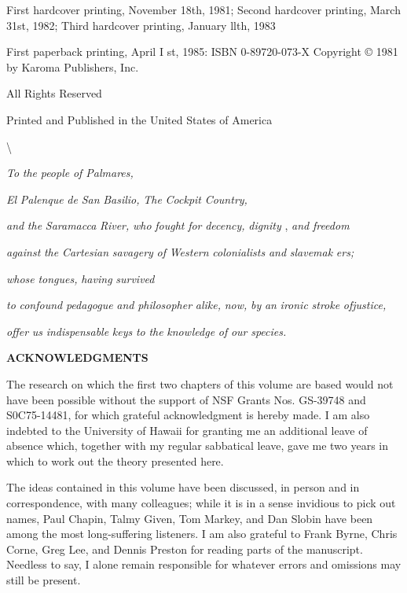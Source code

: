

First hardcover printing, November 18th, 1981; Second hardcover printing, March 31st, 1982; Third hardcover printing, January llth, 1983

First paperback printing, April I st, 1985: ISBN 0-89720-073-X Copyright © 1981 by Karoma Publishers, Inc.

All Rights Reserved

Printed and Published in the United States of America

{\textbackslash}

\textit{To} \textit{the} \textit{people} \textit{of Palmares,}

\textit{El} \textit{Palenque} \textit{d}\textit{e} \textit{San} \textit{Basilio,} \textit{The} \textit{Cockpit} \textit{Country,}

\textit{and} \textit{the} \textit{Saramacca} \textit{River,} \textit{who} \textit{fought} \textit{for} \textit{decency,} \textit{dignity} , \textit{and} \textit{freedom}

\textit{against} \textit{the} \textit{Cartesian} \textit{savagery} \textit{of} \textit{Western} \textit{colonialists} \textit{and} \textit{slavemak} \textit{ers;}

\textit{whose} \textit{tongues,} \textit{having} \textit{survived}

\textit{to} \textit{confound} \textit{pedagogue} \textit{and} \textit{philosopher} \textit{alike,} \textit{now,} \textit{by} \textit{an} \textit{ironic} \textit{stroke} \textit{ofjustice,}

\textit{offer} \textit{us} \textit{indispensable} \textit{keys} \textit{to} \textit{the} \textit{knowledge} \textit{of} \textit{our} \textit{species.}

\bfseries
\hypertarget{TOC250001}{}ACKNOWLEDGMENTS

The research on which the first two chapters of this volume are based would not have been possible without the support of NSF Grants Nos. GS-39748 and S0C75-14481, for which grateful acknowledgment is hereby made. I am also indebted to the University of Hawaii for granting me an additional leave of absence which, together with my regular sabbatical leave, gave me two years in which to work out the theory presented here.

The ideas contained in this volume have been discussed, in person and in correspondence, with many colleagues; while it is in a sense in\-vidious to pick out names, Paul Chapin, Talmy Given, Tom Markey, and Dan Slobin have been among the most long-suffering listeners. I am also grateful to Frank Byrne, Chris Corne, Greg Lee, and Dennis Pres\-ton for reading parts of the manuscript. Needless to say, I alone remain responsible for whatever errors and omissions may still be present.

